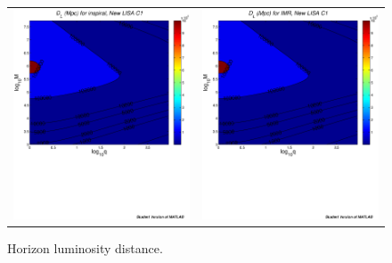 \documentclass{iopart}
\begin{document}
\begin{figure}[H]
\begin{center}
\begin{tabular}{cc}
\includegraphics[scale=0.41,clip=true]{FigEmanuele/C1InspDLContour.ps}
&\includegraphics[scale=0.41,clip=true]{FigEmanuele/C1IMRDLContour.ps}\\
\end{tabular}
\caption{\label{fig:SNRMiniLISA6} Horizon luminosity distance.}
\end{center}
\end{figure}
%
\end{document}
